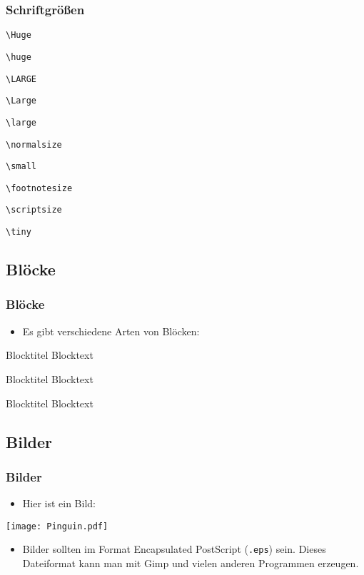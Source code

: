 \begin{frame}[fragile]
	\frametitle{Schriftgrößen}
	
	\Huge
	\verb!\Huge!
	\normalsize
	
	\huge
	\verb!\huge!
	\normalsize
	
	\LARGE
	\verb!\LARGE!
	\normalsize
	
	\Large
	\verb!\Large!
	\normalsize
	
	\large
	\verb!\large!
	\normalsize
	
	\normalsize
	\verb!\normalsize!
	\normalsize
	
	\small
	\verb!\small!
	\normalsize
	
	\footnotesize
	\verb!\footnotesize!
	\normalsize
	
	\scriptsize
	\verb!\scriptsize!
	\normalsize
	
	\tiny
	\verb!\tiny!
	\normalsize
\end{frame}

\subsection{Blöcke}

\begin{frame}[t]
	\frametitle{Blöcke}
	\begin{itemize}
		\item Es gibt verschiedene Arten von Blöcken:
	\end{itemize}
	\begin{block}{Blocktitel}
		Blocktext
	\end{block}
	
	\begin{exampleblock}{Blocktitel}
		Blocktext
	\end{exampleblock}
	
	\begin{alertblock}{Blocktitel}
		Blocktext
	\end{alertblock}
\end{frame}

\subsection{Bilder}

\begin{frame}
	\frametitle{Bilder}
	\begin{itemize}
		\item Hier ist ein Bild:
	\end{itemize}
	\begin{center}
		\texttt{[image: Pinguin.pdf]}
	\end{center}
	\begin{itemize}
		\item Bilder sollten im Format Encapsulated PostScript (\texttt{.eps}) sein. Dieses Dateiformat kann man mit Gimp und vielen anderen Programmen erzeugen.
	\end{itemize}
\end{frame}

